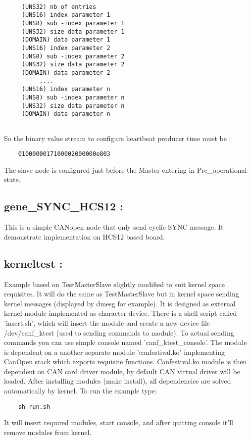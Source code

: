 \documentclass[12pt,english,a4paper]{book}
\newcommand{\canopen}{CANopen }
\begin{document}
\begin{verbatim}

	 (UNS32) nb of entries
	 (UNS16) index parameter 1
	 (UNS8) sub -index parameter 1
	 (UNS32) size data parameter 1
	 (DOMAIN) data parameter 1
	 (UNS16) index parameter 2
	 (UNS8) sub -index parameter 2
	 (UNS32) size data parameter 2
	 (DOMAIN) data parameter 2
	      ....
	 (UNS16) index parameter n
	 (UNS8) sub -index parameter n
	 (UNS32) size data parameter n
	 (DOMAIN) data parameter n
	 
\end{verbatim}


So the binary value stream to configure heartbeat producer
time must be :


\begin{verbatim}
	0100000017100002000000e803
\end{verbatim}


The slave node is configured just before the Master entering
in Pre\_operational state.


\subsection{gene\_SYNC\_HCS12 :}

This is a simple \canopen node that only send cyclic SYNC message.
It demonstrate implementation on HCS12 based board.

\bigskip{}



\subsection{kerneltest :}

Example based on TestMasterSlave slightly modified to suit kernel
space requisites. It will do the same as TestMasterSlave but in kernel
space sending kernel messages (displayed by dmesg for example). It
is designed as external kernel module implemented as character device.
There is a shell script called 'insert.sh', which will insert the
module and create a new device file /dev/canf\_ktest (used to sending
commands to module). To actual sending commands you can use simple
console named 'canf\_ktest\_console'. The module is dependent on a
another separate module 'canfestival.ko' implementing CanOpen stack
which exports requisite functions. Canfestival.ko module is then dependent
on CAN card driver module, by default CAN virtual driver will be loaded.
After installing modules (make install), all dependencies are solved
automatically by kernel. To run the example type: 
\begin{verbatim}
	sh run.sh
\end{verbatim}
It will insert required modules, start console, and after quitting
console it'll remove modules from kernel.
\end{document}
